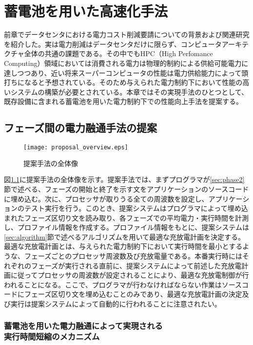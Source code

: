 \chapter{蓄電池を用いた高速化手法}
\label{chap:proposal}

前章でデータセンタにおける電力コスト削減要請についての背景および関連研究を紹介した。実は電力削減はデータセンタだけに限らず、コンピュータアーキテクチャ全体の共通の課題である。その中でもHPC（High Perfomance Computing）領域においては消費される電力は物理的制約による供給可能電力に達しつつあり、近い将来スーパーコンピュータの性能は電力供給能力によって頭打ちになると予想されている。そのため与えられた電力制約下において性能の高いシステムの構築が必要とされている。本章ではその実現手法のひとつとして、既存設備に含まれる蓄電池を用いた電力制約下での性能向上手法を提案する。


\section{フェーズ間の電力融通手法の提案}
\label{sec:curb}

\begin{figure}[t]
 \begin{center}
  \texttt{[image: proposal\_overview.eps]}
 \end{center}
 \caption{提案手法の全体像}
 \label{fig:proposal_overview}
\end{figure}

図\ref{fig:proposal_overview}に提案手法の全体像を示す。提案手法では、まずプログラマが\ref{sec:phase2}節で述べる、フェーズの開始と終了を示す文をアプリケーションのソースコードに埋め込む。次に、プロセッサが取りうる全ての周波数を設定し、アプリケーションのテスト実行を行う。このとき、提案システムはプログラマによって埋め込まれたフェーズ区切り文を読み取り、各フェーズでの平均電力・実行時間を計測し、プロファイル情報を作成する。プロファイル情報をもとに、提案システムは\ref{sec:algorithm}節で述べるアルゴリズムを用いて最適な充放電計画を決定する。最適な充放電計画とは、与えられた電力制約下において実行時間を最小とするような、フェーズごとのプロセッサ周波数及び充放電量である。本番実行時にはそれぞれのフェーズが実行される直前に、提案システムによって前述した充放電計画に従ってプロセッサの周波数が設定されることにより、最適な充放電制御が行われることになる。ここで、プログラマが行わなければならない作業はソースコードにフェーズ区切り文を埋め込むことのみであり、最適な充放電計画の決定及び実行は提案システムによって自動的に行われることに注意されたい。

\subsection{蓄電池を用いた電力融通によって実現される\\実行時間短縮のメカニズム}

